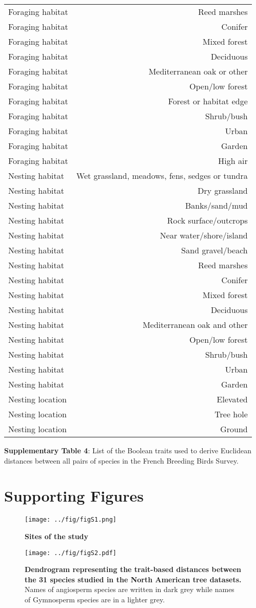 \begin{longtable}[]{@{}lr@{}}
Foraging habitat & Reed marshes\tabularnewline
Foraging habitat & Conifer\tabularnewline
Foraging habitat & Mixed forest\tabularnewline
Foraging habitat & Deciduous\tabularnewline
Foraging habitat & Mediterranean oak or other\tabularnewline
Foraging habitat & Open/low forest\tabularnewline
Foraging habitat & Forest or habitat edge\tabularnewline
Foraging habitat & Shrub/bush\tabularnewline
Foraging habitat & Urban\tabularnewline
Foraging habitat & Garden\tabularnewline
Foraging habitat & High air\tabularnewline
Nesting habitat & Wet grassland, meadows, fens, sedges or
tundra\tabularnewline
Nesting habitat & Dry grassland\tabularnewline
Nesting habitat & Banks/sand/mud\tabularnewline
Nesting habitat & Rock surface/outcrops\tabularnewline
Nesting habitat & Near water/shore/island\tabularnewline
Nesting habitat & Sand gravel/beach\tabularnewline
Nesting habitat & Reed marshes\tabularnewline
Nesting habitat & Conifer\tabularnewline
Nesting habitat & Mixed forest\tabularnewline
Nesting habitat & Deciduous\tabularnewline
Nesting habitat & Mediterranean oak and other\tabularnewline
Nesting habitat & Open/low forest\tabularnewline
Nesting habitat & Shrub/bush\tabularnewline
Nesting habitat & Urban\tabularnewline
Nesting habitat & Garden\tabularnewline
Nesting location & Elevated\tabularnewline
Nesting location & Tree hole\tabularnewline
Nesting location & Ground\tabularnewline
\bottomrule
\end{longtable}

\textbf{Supplementary Table 4}: List of the Boolean traits used to
derive Euclidean distances between all pairs of species in the French
Breeding Birds Survey.

\newpage

\section{Supporting Figures}\label{supporting-figures}

\begin{figure}[htbp]
\centering
\texttt{[image: ../fig/figS1.png]}
\caption{\textbf{Sites of the study}\label{fig:maps}}
\end{figure}

\newpage

\begin{figure}[htbp]
\centering
\texttt{[image: ../fig/figS2.pdf]}
\caption{\textbf{Dendrogram representing the trait-based distances
between the 31 species studied in the North American tree datasets.}
Names of angiosperm species are written in dark grey while names of
Gymnosperm species are in a lighter grey.\label{fig:dendro}}
\end{figure}

